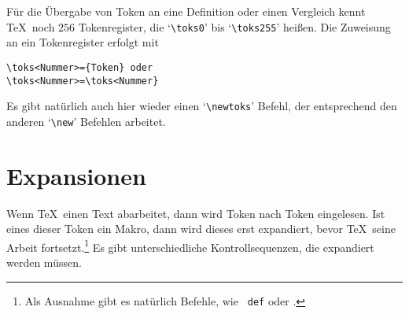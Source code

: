 F\"ur die 
\"Ubergabe von Token an eine Definition oder einen Vergleich
kennt \TeX\ noch $256$ Tokenregister, die
`\verb|\toks0|' bis
`\verb|\toks255|' hei\ss{}en. Die 
Zuweisung an ein Tokenregister erfolgt mit
\begin{verbatim}
\toks<Nummer>={Token} oder
\toks<Nummer>=\toks<Nummer}
\end{verbatim}
Es gibt nat\"urlich auch hier wieder einen 
`\verb|\newtoks|' Befehl, der
entsprechend den anderen 
`\verb|\new|' Befehlen arbeitet.
\section{Expansionen}
Wenn \TeX\ einen Text abarbeitet, dann wird Token nach Token
eingelesen. Ist eines dieser Token ein Makro, dann wird dieses erst
expandiert, bevor \TeX\ seine Arbeit fortsetzt.\footnote{Als Ausnahme
gibt es nat\"urlich Befehle, wie {\tt{} def} oder
.} Es gibt unterschiedliche 
Kontrollsequenzen, die expandiert
werden m\"ussen.
